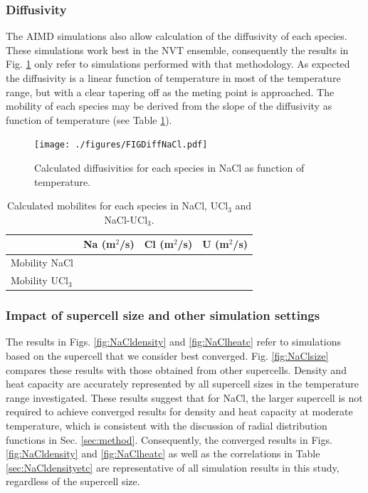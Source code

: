 \documentclass[preprint,3p,10pt,twocolumn,number,sort&compress]{elsarticle}
\begin{document}
\subsubsection{Diffusivity} 
The AIMD simulations also allow calculation of the diffusivity of each species. These simulations work best in the NVT ensemble, consequently the results in Fig. \ref{fig:diffNaCl} only refer to simulations performed with that methodology. 
As expected the diffusivity is a linear function of temperature in most of the temperature range, but with a clear tapering off as the meting point is approached. %
The mobility of each species may be derived from the slope of the diffusivity as function of temperature (see Table \ref{table:NaCldiffusivityetc}). 


\begin{figure}[htb]
\centering
\texttt{[image: ./figures/FIGDiffNaCl.pdf]}
\caption{Calculated diffusivities for each species in NaCl as function of temperature.} 
\label{fig:diffNaCl}
\end{figure}

\begin{table}[hb!]
\centering
\begin{tabular}{lccc}
\hline
\hline
&Na	(m$^2$/s)&Cl (m$^2$/s)&U (m$^2$/s)\\
\hline
Mobility NaCl & & &\\
Mobility UCl$_3$	& & &\\
\hline
\hline
\end{tabular}
\caption{Calculated mobilites for each species in NaCl, UCl$_3$ and  NaCl-UCl$_3$.}
\label{table:NaCldiffusivityetc}
\end{table}

\subsubsection{Impact of supercell size and other simulation settings}
The results in Figs. \ref{fig:NaCldensity} and \ref{fig:NaClheatc} refer to simulations based on the supercell that we consider best converged. Fig. \ref{fig:NaClsize} compares these results with those obtained from other supercells. Density and heat capacity are accurately represented by all supercell sizes in the temperature range investigated.
 These results suggest that for NaCl, the larger supercell is not required to achieve converged results for density and heat capacity at moderate temperature, which is consistent with the discussion of radial distribution functions in Sec. \ref{sec:method}. Consequently, the converged results in Figs. \ref{fig:NaCldensity} and \ref{fig:NaClheatc} as well as the correlations in Table \ref{sec:NaCldensityetc} are representative of all simulation results in this study, regardless of the supercell size. %
\end{document}
